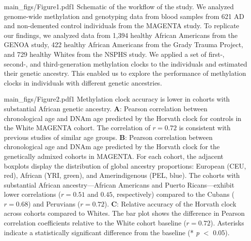 







{main_figs/Figure1.pdf}{1}
    {Schematic of the workflow of the study.}
    {We analyzed genome-wide methylation and genotyping data from blood samples from 621 AD and non-demented control individuals from the MAGENTA study. To replicate our findings, we analyzed data from 1,394 healthy African Americans from the GENOA study, 422 healthy African Americans from the Grady Trauma Project, and 729 healthy Whites from the NSPHS study. We applied a set of first-, second-, and third-generation methylation clocks to the individuals and estimated their genetic ancestry. This enabled us to explore the performance of methylation clocks in individuals with different genetic ancestries.}
    
{main_figs/Figure2.pdf}{1}
    {Methylation clock accuracy is lower in cohorts with substantial African genetic ancestry.}
    {{
        {\textbf{A}: Pearson correlation between chronological age and DNAm age predicted by the Horvath clock for controls in the White MAGENTA cohort. The correlation of $r = 0.72$ is consistent with previous studies of similar age groups.}
        {\textbf{B}: Pearson correlation between chronological age and DNAm age predicted by the Horvath clock for the genetically admixed cohorts in MAGENTA. For each cohort, the adjacent boxplots display the distribution of global ancestry proportions: European (CEU, red), African (YRI, green), and Amerindigenous (PEL, blue). The cohorts with substantial African ancestry---African Americans and Puerto Ricans---exhibit lower correlations ($r = 0.51$ and $0.45$, respectively) compared to the Cubans ($r = 0.68$) and Peruvians ($r = 0.72$).}
        {\textbf{C}: Relative accuracy of the Horvath clock across cohorts compared to Whites. The bar plot shows the difference in Pearson correlation coefficients relative to the White cohort baseline ($r = 0.72$). Asterisks indicate a statistically significant difference from the baseline (* \textit{p} $<$ 0.05).}
    }}


